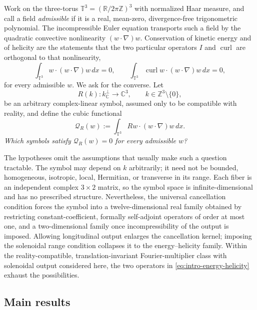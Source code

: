 \documentclass[11pt]{article}
\theoremstyle{definition}
\theoremstyle{remark}
\theoremstyle{plain}
\DeclareMathOperator{\curl}{curl}
\newcommand{\T}{\mathbb{T}}
\newcommand{\Z}{\mathbb{Z}}
\newcommand{\R}{\mathbb{R}}
\newcommand{\C}{\mathbb{C}}
\newcommand{\Qform}{\mathcal{Q}}
\newcommand{\kperp}{k_{\C}^{\perp}}
\begin{document}
Work on the three-torus $\T^{3}=(\R/2\pi\Z)^{3}$ with normalized Haar
measure, and call a field \emph{admissible} if it is a real, mean-zero,
divergence-free trigonometric polynomial. The incompressible Euler equation
transports such a field by the quadratic convective nonlinearity
$(w\cdot\nabla)w$. Conservation of kinetic energy and of helicity are the
statements that the two particular operators $I$ and $\curl$ are orthogonal to
that nonlinearity,
\begin{equation}
\label{eq:intro-energy-helicity}
\int_{\T^{3}}w\cdot(w\cdot\nabla)w\,dx=0,
\qquad
\int_{\T^{3}}\curl w\cdot(w\cdot\nabla)w\,dx=0,
\end{equation}
for every admissible $w$. We ask for the converse. Let
\begin{equation}
\label{eq:intro-symbol}
R(k):\kperp\longrightarrow\C^{3},
\qquad k\in\Z^{3}\setminus\{0\},
\end{equation}
be an arbitrary complex-linear symbol, assumed only to be compatible with
reality, and define the cubic functional
\begin{equation}
\label{eq:intro-Q}
\Qform_{R}(w)
:=\int_{\T^{3}}Rw\cdot(w\cdot\nabla)w\,dx .
\end{equation}
\emph{Which symbols satisfy $\Qform_{R}(w)=0$ for every admissible $w$?}

The hypotheses omit the assumptions that usually make such a question
tractable. The symbol may depend on $k$ arbitrarily; it need not be bounded,
homogeneous, isotropic, local, Hermitian, or transverse in its range. Each
fiber is an independent complex $3\times2$ matrix, so the symbol space is
infinite-dimensional and has no prescribed structure. Nevertheless, the
universal cancellation condition forces the symbol into a
twelve-dimensional real family obtained by restricting constant-coefficient,
formally self-adjoint operators of order at most one, and a two-dimensional
family once incompressibility of the output is imposed. Allowing longitudinal
output enlarges the cancellation kernel; imposing the solenoidal range
condition collapses it to the energy--helicity family. Within the
reality-compatible,
translation-invariant Fourier-multiplier class with solenoidal output considered
here, the two operators in \eqref{eq:intro-energy-helicity} exhaust the
possibilities.

\subsection{Main results}
\label{subsec:main-results}
\end{document}
